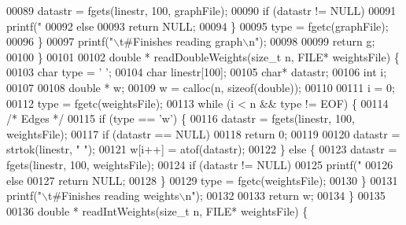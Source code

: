 \begin{DoxyCode}
{{{{{{00089                         datastr = fgets(linestr, 100, graphFile);
00090                         \textcolor{keywordflow}{if} (datastr != NULL)
00091                                 printf(\textcolor{stringliteral}{" %
00092                         \textcolor{keywordflow}{else}
00093                                 \textcolor{keywordflow}{return} NULL;
00094                 \}
00095                 type = fgetc(graphFile);
00096         \}
00097         printf(\textcolor{stringliteral}{"\(\backslash\)t#Finishes reading graph\(\backslash\)n"});
00098 
00099         \textcolor{keywordflow}{return} g;
00100 \}
00101 
00102 \textcolor{keywordtype}{double} * readDoubleWeights(\textcolor{keywordtype}{size\_t} n, FILE* weightsFile) \{
00103         \textcolor{keywordtype}{char} type = \textcolor{charliteral}{' '};
00104         \textcolor{keywordtype}{char} linestr[100];
00105         \textcolor{keywordtype}{char}* datastr;
00106         \textcolor{keywordtype}{int} i;
00107 
00108         \textcolor{keywordtype}{double} * w;
00109         w = calloc(n, \textcolor{keyword}{sizeof}(\textcolor{keywordtype}{double}));
00110 
00111         i = 0;
00112         type = fgetc(weightsFile);
00113         \textcolor{keywordflow}{while} (i < n && type != EOF) \{
00114                 \textcolor{comment}{/* Edges */}
00115                 \textcolor{keywordflow}{if} (type == \textcolor{charliteral}{'w'}) \{
00116                         datastr = fgets(linestr, 100, weightsFile);
00117                         \textcolor{keywordflow}{if} (datastr == NULL)
00118                                 \textcolor{keywordflow}{return} 0;
00119 
00120                         datastr = strtok(linestr, \textcolor{stringliteral}{" "});
00121                         w[i++] = atof(datastr);
00122                 \} \textcolor{keywordflow}{else} \{
00123                         datastr = fgets(linestr, 100, weightsFile);
00124                         \textcolor{keywordflow}{if} (datastr != NULL)
00125                                 printf(\textcolor{stringliteral}{" %
00126                         \textcolor{keywordflow}{else}
00127                                 \textcolor{keywordflow}{return} NULL;
00128                 \}
00129                 type = fgetc(weightsFile);
00130         \}
00131         printf(\textcolor{stringliteral}{"\(\backslash\)t#Finishes reading weights\(\backslash\)n"});
00132 
00133         \textcolor{keywordflow}{return} w;
00134 \}
00135 
00136 \textcolor{keywordtype}{double} * readIntWeights(\textcolor{keywordtype}{size\_t} n, FILE* weightsFile) \{
}}}}}}}}
\end{DoxyCode}
